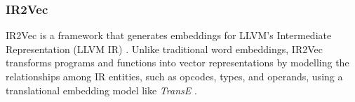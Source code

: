 \subsubsection{IR2Vec} \label{subsubsec:IR2Vec}





IR2Vec is a framework that generates embeddings for LLVM's Intermediate Representation (LLVM IR) \cite{IR2Vec}. Unlike traditional word embeddings, IR2Vec transforms programs and functions into vector representations by modelling the relationships among IR entities, such as opcodes, types, and operands, using a translational embedding model like \textit{TransE} \cite{TranslationalEncoding}.

